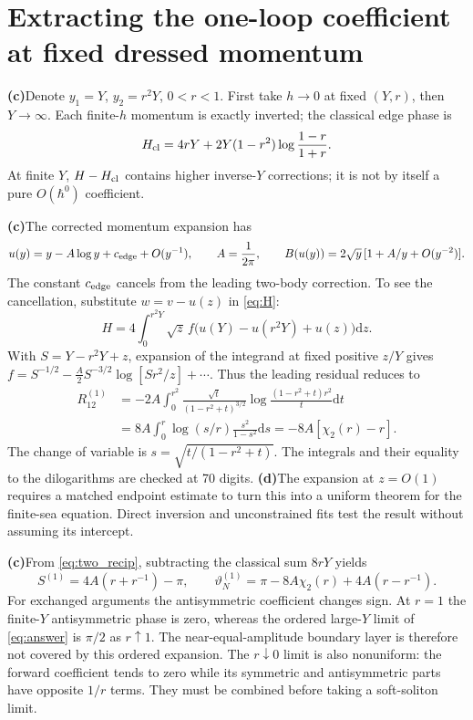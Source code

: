 \documentclass[11pt,a4paper]{article}
\newcommand{\C}{\textbf{(c)}\nobreakspace}
\newcommand{\D}{\textbf{(d)}\nobreakspace}
\newcommand{\dd}{\mathrm d}
\begin{document}
\section{Extracting the one-loop coefficient at fixed dressed momentum}
\C Denote $y_1=Y$, $y_2=r^2Y$, $0<r<1$. First take $h\to0$ at fixed
$(Y,r)$, then $Y\to\infty$. Each finite-$h$ momentum is exactly inverted;
the classical edge phase is
\begin{equation}
 H_{\rm cl}=4rY+2Y(1-r^2)\log\frac{1-r}{1+r}.
\end{equation}
At finite $Y$, $H-H_{\rm cl}$ contains higher inverse-$Y$ corrections;
it is not by itself a pure $O(\hbar^0)$ coefficient.

\C The corrected momentum expansion has
\begin{equation}
 u(y)=y-A\log y+c_{\rm edge}+O(y^{-1}),\qquad A=\frac1{2\pi},
 \qquad B(u(y))=2\sqrt y\,[1+A/y+O(y^{-2})].
\end{equation}
The constant $c_{\rm edge}$ cancels from the leading two-body correction.
To see the cancellation, substitute $w=v-u(z)$ in \eqref{eq:H}:
\begin{equation}
 H=4\int_0^{r^2Y}\sqrt z\,
 f\bigl(u(Y)-u(r^2Y)+u(z)\bigr)\dd z.
 \label{eq:regular}
\end{equation}
With $S=Y-r^2Y+z$, expansion of the integrand at fixed positive $z/Y$
gives $f=S^{-1/2}-\frac A2 S^{-3/2}\log[S r^2/z]+\cdots$.
Thus the leading residual reduces to
\begin{align}
 R_{12}^{(1)}
 &=-2A\int_0^{r^2}\frac{\sqrt t}{(1-r^2+t)^{3/2}}
       \log\frac{(1-r^2+t)r^2}{t}\dd t\\
 &=8A\int_0^r\log(s/r)\frac{s^2}{1-s^2}\dd s
 =-8A[\chi_2(r)-r].
 \label{eq:c0}
\end{align}
The change of variable is $s=\sqrt{t/(1-r^2+t)}$.
The integrals and their equality to the dilogarithms are checked at 70 digits.
\D The expansion at $z=O(1)$ requires a matched endpoint estimate to turn
this into a uniform theorem for the finite-sea equation. Direct inversion
and unconstrained fits test the result without assuming its intercept.

\C From \eqref{eq:two_recip}, subtracting the classical sum $8rY$ yields
\begin{equation}
 S^{(1)}=4A(r+r^{-1})-\pi,\qquad
 \boxed{\vartheta_N^{(1)}=\pi-8A\chi_2(r)+4A(r-r^{-1}).}
 \label{eq:answer}
\end{equation}
For exchanged arguments the antisymmetric coefficient changes sign.
At $r=1$ the finite-$Y$ antisymmetric phase is zero, whereas the ordered
large-$Y$ limit of \eqref{eq:answer} is $\pi/2$ as $r\uparrow1$.
The near-equal-amplitude boundary layer is therefore not covered by this
ordered expansion. The $r\downarrow0$ limit is also nonuniform: the forward
coefficient tends to zero while its symmetric and antisymmetric parts have
opposite $1/r$ terms. They must be combined before taking a soft-soliton limit.
\end{document}
